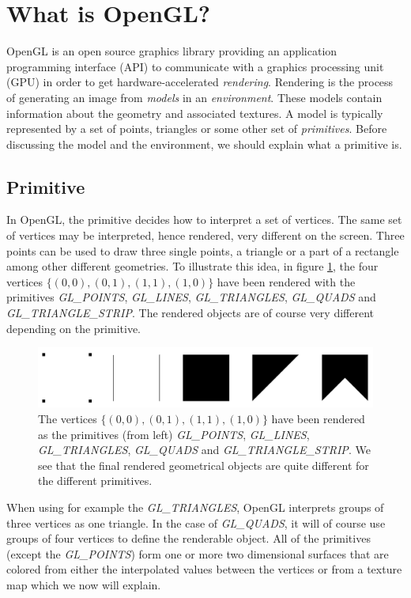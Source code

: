 \section{What is OpenGL?}
\label{sec:opengl}
OpenGL is an open source graphics library providing an application programming interface (API) to communicate with a graphics processing unit (GPU) in order to get hardware-accelerated \textit{rendering}. Rendering is the process of generating an image from \textit{models} in an \textit{environment}. These models contain information about the geometry and associated textures. A model is typically represented by a set of points, triangles or some other set of \textit{primitives}. Before discussing the model and the environment, we should explain what a primitive is.
\subsection{Primitive}
In OpenGL, the primitive decides how to interpret a set of vertices. The same set of vertices may be interpreted, hence rendered, very different on the screen. Three points can be used to draw three single points, a triangle or a part of a rectangle among other different geometries. To illustrate this idea, in figure \ref{fig:opengl_primitives}, the four vertices $\{(0,0), (0,1), (1,1), (1,0)\}$ have been rendered with the primitives \textit{GL\_POINTS}, \textit{GL\_LINES}, \textit{GL\_TRIANGLES}, \textit{GL\_QUADS} and \textit{GL\_TRIANGLE\_STRIP}. The rendered objects are of course very different depending on the primitive. 
\begin{figure}[h]
\begin{center}
\includegraphics[width=\textwidth, trim=0cm 0cm 0cm 0cm, clip]{opengl/figures/primitives.png}
\end{center}
\caption{The vertices $\{(0,0), (0,1), (1,1), (1,0)\}$ have been rendered as the primitives (from left) \textit{GL\_POINTS}, \textit{GL\_LINES}, \textit{GL\_TRIANGLES}, \textit{GL\_QUADS} and \textit{GL\_TRIANGLE\_STRIP}. We see that the final rendered geometrical objects are quite different for the different primitives.}
\label{fig:opengl_primitives}
\end{figure}
When using for example the \textit{GL\_TRIANGLES}, OpenGL interprets groups of three vertices as one triangle. In the case of \textit{GL\_QUADS}, it will of course use groups of four vertices to define the renderable object. All of the primitives (except the \textit{GL\_POINTS}) form one or more two dimensional surfaces that are colored from either the interpolated values between the vertices or from a texture map which we now will explain.
